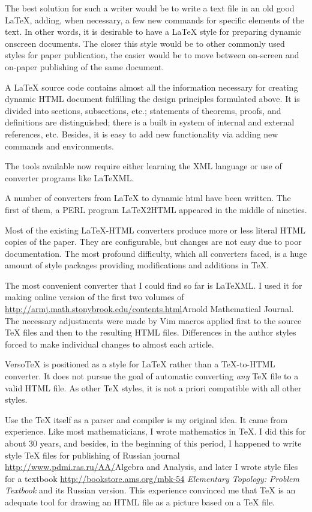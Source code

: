 \documentclass{article}
\begin{document}
The best solution for such a writer would be to write
a text file in an old good LaTeX, adding, when necessary, a few new 
commands for 
specific elements of the text. In other words, it is desirable 
to have a LaTeX style for preparing dynamic onscreen documents. The
closer this style would be to other commonly used styles for paper
publication, the easier would be to move between on-screen and on-paper
publishing of the same document.

A LaTeX source code contains almost all the information necessary
for creating dynamic HTML document fulfilling the design principles 
formulated above. It is divided into sections, subsections, etc.; 
statements of theorems, proofs, and definitions are distinguished; 
there is a built in system of internal and external references, etc.
Besides, it is easy to add new functionality via adding new commands
and environments. 

The tools available now require either learning the XML language or use of 
converter programs like LaTeXML.

A number of converters from LaTeX to dynamic html have been
written. The first of them, a PERL program LaTeX2HTML appeared in the
middle of nineties. 

Most of the existing LaTeX-HTML converters produce more or less literal
HTML copies of the paper. They are configurable, but changes are not
easy due to poor documentation. The most profound difficulty, which all 
converters faced, is a huge amount of style packages providing 
modifications and additions in TeX. 

The most convenient converter that I could
find so far is LaTeXML. I used it for making online version of the first
two volumes of \url{http://armj.math.stonybrook.edu/contents.html}{Arnold
Mathematical Journal.}
The necessary adjustments were made by Vim macros applied first to the source
TeX files and then to the resulting HTML files. Differences in
the author styles forced to make individual changes to almost each article.

VersoTeX is positioned as a style for LaTeX rather than a TeX-to-HTML
converter. It does not pursue the goal of automatic converting {\em any\/} 
TeX file to a valid HTML file. As other TeX styles, it is not a priori 
compatible with all other styles. 

Use the TeX itself as a parser and compiler is my original idea. It came
from experience. Like most mathematicians, I wrote mathematics in TeX.  
I did this for about 30 years, and besides, in the beginning of this 
period, I happened to write style TeX files for publishing of Russian journal 
\url{http://www.pdmi.ras.ru/AA/}{Algebra and Analysis}, and later I wrote 
style files for a textbook 
\url{http://bookstore.ams.org/mbk-54}{\textit{ Elementary Topology: Problem
Textbook\/}} and its Russian version. This experience convinced me that 
TeX is an adequate tool for drawing an HTML file as a picture based on a
TeX file. 
\end{document}
